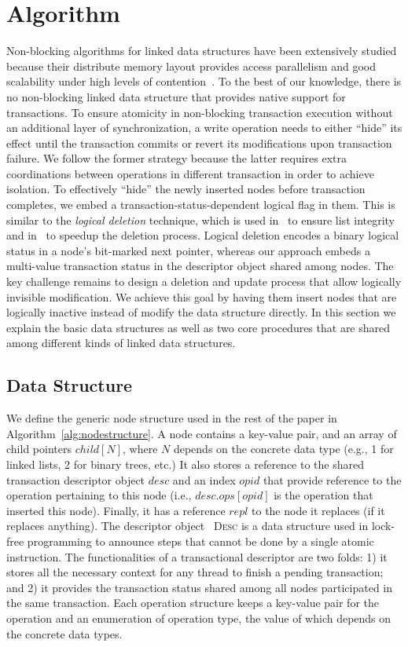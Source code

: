 \documentclass[10pt,conference,compsocconf]{IEEEtran}
\begin{document}
\section{Algorithm}
\label{sec:algorithm}
Non-blocking algorithms for linked data structures have been extensively studied because their distribute memory layout provides access parallelism and good scalability under high levels of contention~\cite{linden2013skiplist,zhang2015lockfree,michael2002high}.
To the best of our knowledge, there is no non-blocking linked data structure that provides native support for transactions.
To ensure atomicity in non-blocking transaction execution without an additional layer of synchronization, a write operation needs to either ``hide'' its effect until the transaction commits or revert its modifications upon transaction failure.
We follow the former strategy because the latter requires extra coordinations between operations in different transaction in order to achieve isolation.
To effectively ``hide'' the newly inserted nodes before transaction completes, we embed a transaction-status-dependent logical flag in them. 
This is similar to the \emph{logical deletion} technique, which is used in~\cite{harris2001pragmatic} to ensure list integrity and in~\cite{linden2013skiplist,zhang2015lockfree} to speedup the deletion process.
Logical deletion encodes a binary logical status in a node's bit-marked next pointer, whereas our approach embeds a multi-value transaction status in the descriptor object shared among nodes.
The key challenge remains to design a deletion and update process that allow logically invisible modification.
We achieve this goal by having them insert nodes that are logically inactive instead of modify the data structure directly.
In this section we explain the basic data structures as well as two core procedures that are shared among different kinds of linked data structures.

\subsection{Data Structure}
We define the generic node structure used in the rest of the paper in Algorithm~\ref{alg:nodestructure}. 
A node contains a key-value pair, and an array of child pointers $child[N]$, where $N$ depends on the concrete data type (e.g., 1 for linked lists, 2 for binary trees, etc.)
It also stores a reference to the shared transaction descriptor object $desc$ and an index $opid$ that provide reference to the operation pertaining to this node (i.e., $desc.ops[opid]$ is the operation that inserted this node).
Finally, it has a reference $repl$ to the node it replaces (if it replaces anything).
The descriptor object~\cite{herlihy2012art} \textsc{Desc} is a data structure used in lock-free programming to announce steps that cannot be done by a single atomic instruction.
The functionalities of a transactional descriptor are two folds: 1) it stores all the necessary context for any thread to finish a pending transaction; and 2) it provides the transaction status shared among all nodes participated in the same transaction.
Each operation structure keeps a key-value pair for the operation and an enumeration of operation type, the value of which depends on the concrete data types.
\end{document}
